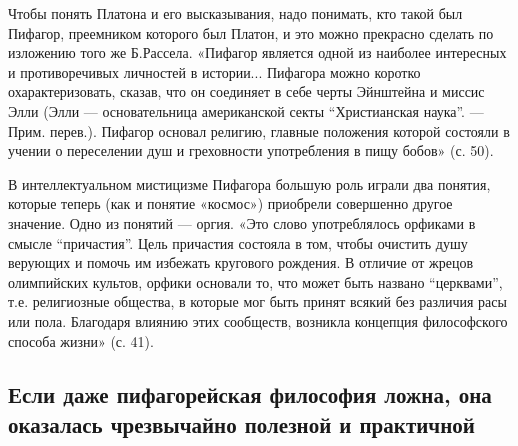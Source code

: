 Чтобы понять Платона и его  высказывания, надо понимать, кто такой был
Пифагор, преемником которого был Платон, и это можно прекрасно сделать
по изложению  того же Б.Рассела.  «Пифагор является одной  из наиболее
интересных  и противоречивых  личностей  в  истории... Пифагора  можно
коротко  охарактеризовать,  сказав,  что  он соединяет  в  себе  черты
Эйнштейна и  миссис Элли  (Элли --- основательница  американской секты
``Христианская наука''.  --- Прим.  перев.). Пифагор  основал религию,
главные  положения  которой состояли  в  учении  о переселении  душ  и
греховности употребления в пищу бобов» (с. 50).

В  интеллектуальном  мистицизме  Пифагора   большую  роль  играли  два
понятия, которые теперь (как  и понятие «космос») приобрели совершенно
другое значение. Одно  из понятий --- оргия.  «Это слово употреблялось
орфиками в смысле ``причастия''. Цель  причастия состояла в том, чтобы
очистить  душу верующих  и помочь  им избежать  кругового рождения.  В
отличие от жрецов  олимпийских культов, орфики основали  то, что может
быть названо  ``церквами'', т.е.  религиозные общества, в  которые мог
быть принят всякий без различия  расы или пола. Благодаря влиянию этих
сообществ, возникла концепция философского способа жизни» (с. 41).

\subsection{Если  даже пифагорейская  философия  ложна, она  оказалась
чрезвычайно полезной и практичной}


